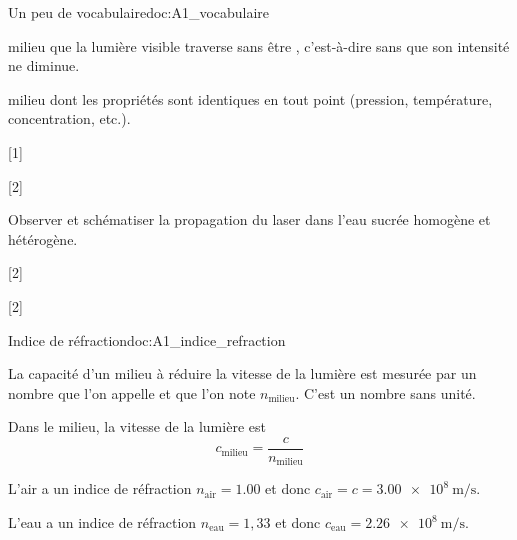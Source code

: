 \begin{doc}{Un peu de vocabulaire}{doc:A1_vocabulaire}
  \begin{importants}
     milieu que la lumière visible traverse sans être , c'est-à-dire sans que son intensité ne diminue.
  \end{importants}
  \begin{importants}
     milieu dont les propriétés sont identiques en tout point (pression, température, concentration, etc.).
  \end{importants}
\end{doc}

[1]

[2]


\newpage
\mesure Observer et schématiser la propagation du laser dans l'eau sucrée homogène et hétérogène.
\vspace{4cm}

[2]

[2]

\begin{doc}{Indice de réfraction}{doc:A1_indice_refraction}
  \begin{importants}
    La capacité d'un milieu à réduire la vitesse de la lumière est mesurée par un nombre que l'on appelle  et que l'on note $n_\text{milieu}$.
    C'est un nombre sans unité.
    
    Dans le milieu, la vitesse de la lumière est
    \begin{equation*}
      c_\text{milieu} = \dfrac{c}{n_\text{milieu}}
    \end{equation*}
  \end{importants}
  
  \exemple*
  \begin{listePoints}
    \item L'air a un indice de réfraction $n_\text{air} = \num{1,00}$ et donc $c_\text{air} = c = \qty{3,00e8}{\m\per\s}$.
    \item L'eau a un indice de réfraction $n_\text{eau} = 1,\!33$ et donc $c_\text{eau} = \qty{2,26e8}{\m\per\s}$.
  \end{listePoints}
\end{doc}

